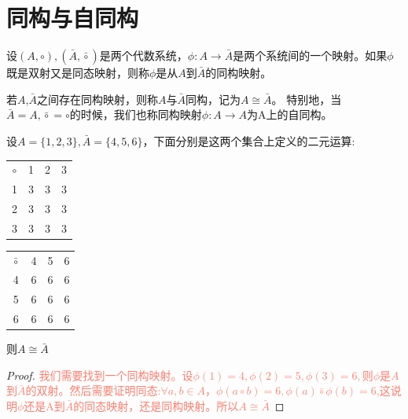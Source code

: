 \documentclass[
	11pt, %
	fleqn, %
	a4paper, %
]{LegrandOrangeBook}
\begin{document}
\section{同构与自同构}
\begin{definition}[同构与自同构]
	\hfill\par
	设$(A,\circ),(\bar{A},\bar{\circ})$是两个代数系统，$\phi:A\rightarrow \bar{A}$是两个系统间的一个映射。如果$\phi$既是双射又是同态映射，则称$\phi$是从$A$到$\bar{A}$的同构映射。

	若$A$,$\bar{A}$之间存在同构映射，则称$A$与$\bar{A}$同构，记为$A\cong \bar{A}$。
	特别地，当$\bar{A}=A,\bar{\circ}=\circ$的时候，我们也称同构映射$\phi:A\rightarrow A$为A上的自同构。
\end{definition}

\begin{example}
	设$A=\{1,2,3\},\bar{A}=\{4,5,6\}$，下面分别是这两个集合上定义的二元运算:



	\begin{center}
		\begin{tabular}{c|ccc}

			$\circ$ & 1 & 2 & 3 \\\cline{1-4}
			1       & 3 & 3 & 3 \\
			2       & 3 & 3 & 3 \\
			3       & 3 & 3 & 3
		\end{tabular}
		\quad
		\begin{tabular}{c|ccc}

			$\bar{\circ}$ & 4 & 5 & 6 \\\cline{1-4}
			4             & 6 & 6 & 6 \\
			5             & 6 & 6 & 6 \\
			6             & 6 & 6 & 6
		\end{tabular}
	\end{center}

	则$A\cong\bar{A}$
\end{example}
\begin{proof}
	\textcolor{Salmon}{我们需要找到一个同构映射。设$\phi(1)=4,\phi(2)=5,\phi(3)=6,$则$\phi$是$A$到$\bar{A}$的双射。然后需要证明同态:$\forall a,b\in A$，$\phi(a\circ b)=6,\phi(a)\bar{\circ}\phi(b)=6$,这说明$\phi$还是A到$\bar{A}$的同态映射，还是同构映射。所以$A\cong\bar{A}$}
\end{proof}
\end{document}
